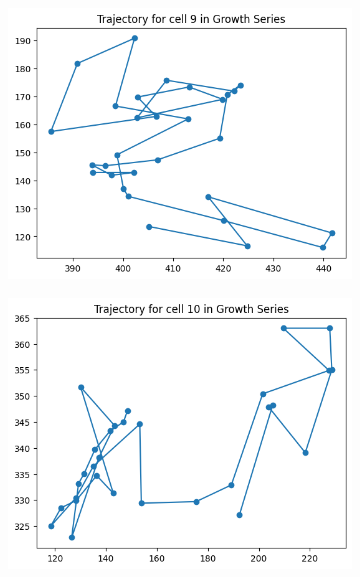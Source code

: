 \documentclass{article}
\begin{document}
\begin{figure}[h!]
    \centering
    \begin{subfigure}[b]{0.5\linewidth}
        \centering
        \includegraphics[width=\linewidth]{Report/Appendix_Images/Trajectory-B-Growth/trajectory_9.png}
    \end{subfigure}%
    \begin{subfigure}[b]{0.5\linewidth}
        \centering
        \includegraphics[width=\linewidth]{Report/Appendix_Images/Trajectory-B-Growth/trajectory_10.png}
    \end{subfigure}
    \begin{subfigure}[b]{0.5\linewidth}

\end{subfigure}
\end{figure}
\end{document}
